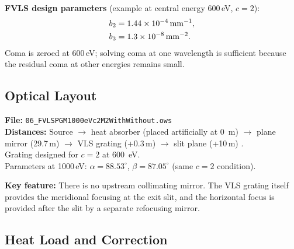 \documentclass[12pt,a4paper]{article}
\newcommand{\placeholder}[4][\linewidth]{%
  \begin{figure}[H]
    \centering
    \begin{tikzpicture}
      \draw[fill=plbg, draw=plframe, line width=1pt, dashed]
            (0,0) rectangle (#1, #2);
      \draw[plframe, line width=0.4pt] (0,0) -- (#1,#2);
      \draw[plframe, line width=0.4pt] (#1,0) -- (0,#2);
      \node[anchor=north west, font=\small\bfseries\color{plframe},
            inner sep=4pt] at (0,#2) {#3};
      \node[anchor=center, font=\small\itshape\color{pltext},
            text width=0.75\linewidth, align=center]
            at ({0.5*#1},{0.5*#2}) {#4};
    \end{tikzpicture}
  \end{figure}
}
\newcommand{\al}{\alpha}
\newcommand{\be}{\beta}
\begin{document}
\begin{keyresult}
\textbf{FVLS design parameters} (example at central energy 600\,eV, $c = 2$):
\begin{align}
  b_2 &= 1.44 \times 10^{-4}\,\mathrm{mm}^{-1}, \notag\\
  b_3 &= 1.3  \times 10^{-8}\,\mathrm{mm}^{-2}. \notag
\end{align}
Coma is zeroed at 600\,eV; solving coma at one wavelength is sufficient because the
residual coma at other energies remains small.
\end{keyresult}


\subsection{Optical Layout}

\begin{exbox}
\textbf{File:} \texttt{06\_FVLSPGM1000eVc2M2WithWithout.ows
}\\[4pt]
\textbf{Distances:} Source $\to$ heat absorber (placed artificially at 0~m) $\to$ plane mirror (29.7\,m) $\to$ VLS
grating (+0.3\,m) $\to$ slit plane (+10\,m) .\\
Grating designed for $c=2$ at 600~eV. \\
Parameters at 1000\,eV: $\al = 88.53^\circ$, $\be = 87.05^\circ$ (same $c = 2$ condition).

\medskip
\textbf{Key feature:} There is no upstream collimating mirror.  The VLS grating itself
provides the meridional focusing at the exit slit, and the horizontal focus is provided
after the slit by a separate refocusing mirror.
\end{exbox}


\subsection{Heat Load and Correction}
\end{document}
